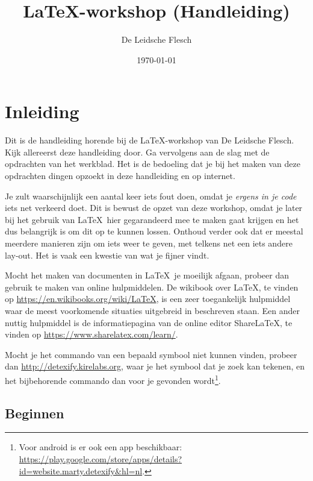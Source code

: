 \documentclass{article}
\title{\LaTeX-workshop (Handleiding)}
\author{De Leidsche Flesch}
\date{\today}
\begin{document}
\maketitle
\tableofcontents
\newpage

\section{Inleiding}

Dit is de handleiding horende bij de \LaTeX-workshop van De Leidsche Flesch.
Kijk allereerst deze handleiding door. Ga vervolgens aan de slag met de opdrachten van het werkblad. Het is
de bedoeling dat je bij het maken van deze opdrachten dingen opzoekt in deze handleiding en op internet. 

Je zult waarschijnlijk een aantal keer iets fout doen, omdat je \emph{ergens in
je code} iets net verkeerd doet. Dit is bewust de opzet van deze workshop, omdat
je later bij het gebruik van \LaTeX\ hier gegarandeerd mee te maken gaat krijgen
en het dus belangrijk is om dit op te kunnen lossen. Onthoud verder ook dat er
meestal meerdere manieren zijn om iets weer te geven, met telkens net een iets
andere lay-out. Het is vaak een kwestie van wat je fijner vindt.

Mocht het maken van documenten in \LaTeX\ je moeilijk afgaan, probeer dan gebruik te maken van online hulpmiddelen. De wikibook over \LaTeX, te vinden op \url{https://en.wikibooks.org/wiki/LaTeX}, is een zeer toegankelijk hulpmiddel waar de meest voorkomende situaties uitgebreid in beschreven staan. Een ander nuttig hulpmiddel is de informatiepagina van de online editor ShareLaTeX, te vinden op \url{https://www.sharelatex.com/learn/}.

Mocht je het commando van een bepaald symbool niet kunnen vinden, probeer dan \url{http://detexify.kirelabs.org}, waar je het symbool dat je zoek kan tekenen, en het bijbehorende commando dan voor je gevonden wordt\footnote{Voor android is er ook een app beschikbaar: \url{https://play.google.com/store/apps/details?id=website.marty.detexify\&hl=nl}.}.

\subsection{Beginnen}
\end{document}
